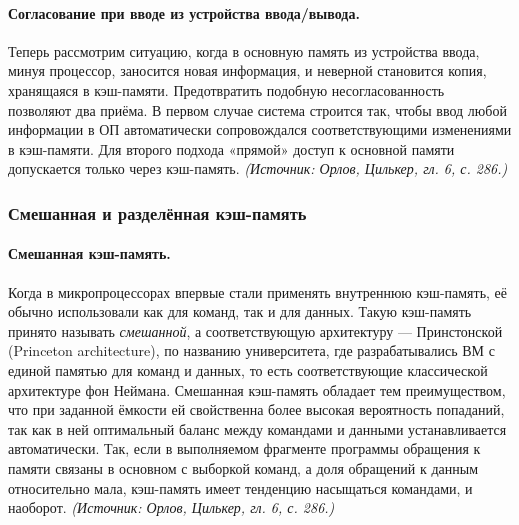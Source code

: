 \documentclass[a4paper,12pt]{article}
\begin{document}
\paragraph{Согласование при вводе из устройства ввода/вывода.}
Теперь рассмотрим ситуацию, когда в основную память из устройства ввода, минуя процессор, заносится новая информация, и неверной становится копия, хранящаяся в кэш-памяти. Предотвратить подобную несогласованность позволяют два приёма. В первом случае система строится так, чтобы ввод любой информации в ОП автоматически сопровождался соответствующими изменениями в кэш-памяти. Для второго подхода «прямой» доступ к основной памяти допускается только через кэш-память.
\textit{(Источник: Орлов, Цилькер, гл. 6, с. 286.)}

\subsubsection{Смешанная и разделённая кэш-память}

\paragraph{Смешанная кэш-память.}
Когда в микропроцессорах впервые стали применять внутреннюю кэш-память, её обычно использовали как для команд, так и для данных. Такую кэш-память принято называть \emph{смешанной}, а соответствующую архитектуру --- Принстонской (Princeton architecture), по названию университета, где разрабатывались ВМ с единой памятью для команд и данных, то есть соответствующие классической архитектуре фон Неймана. Смешанная кэш-память обладает тем преимуществом, что при заданной ёмкости ей свойственна более высокая вероятность попаданий, так как в ней оптимальный баланс между командами и данными устанавливается автоматически. Так, если в выполняемом фрагменте программы обращения к памяти связаны в основном с выборкой команд, а доля обращений к данным относительно мала, кэш-память имеет тенденцию насыщаться командами, и наоборот.
\textit{(Источник: Орлов, Цилькер, гл. 6, с. 286.)}
\end{document}
